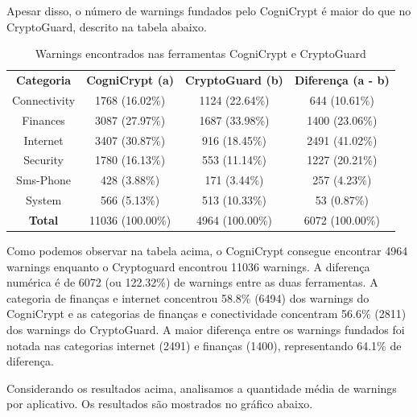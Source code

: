 Apesar disso, o número de warnings fundados pelo CogniCrypt é maior do que no CryptoGuard, descrito na tabela abaixo.

\begin{table}[!htbp]
  \centering
  \begin{tabular}{|c|c|c|c|}
  
\textbf{Categoria}   & \textbf{CogniCrypt (a)}   &  \textbf{CryptoGuard (b)}     &  \textbf{Diferença (a - b)} \\ 
Connectivity           & \num{1768} (\num{16.02}\%)  &  \num{1124} (\num{22.64}\%)  & \num{644} (\num{10.61}\%) \\
Finances                &     \num{3087} (\num{27.97}\%)     &     \num{1687} (\num{33.98}\%)     &     \num{1400} (\num{23.06}\%)\\
Internet                 &     \num{3407} (\num{30.87}\%)     &     \num{916} (\num{18.45}\%)     &     \num{2491} (\num{41.02}\%)\\
Security                 &     \num{1780} (\num{16.13}\%)     &     \num{553} (\num{11.14}\%)     &     \num{1227} (\num{20.21}\%)\\
Sms-Phone            &     \num{428} (\num{3.88}\%)     &     \num{171} (\num{3.44}\%)     &     \num{257} (\num{4.23}\%)\\
System                  &     \num{566} (\num{5.13}\%)     &     \num{513} (\num{10.33}\%)     &     \num{53} (\num{0.87}\%)\\
\textbf{Total}                     &     \num{11036} (\num{100.00}\%)     &     \num{4964} (100.00\%)     &     \num{6072} (\num{100.00}\%)\\
\end{tabular}
    
  \caption{Warnings encontrados nas ferramentas CogniCrypt e CryptoGuard}
\label{AplicativosComWarning}
\end{table}

Como podemos observar na tabela acima, o CogniCrypt consegue encontrar 4964 warnings enquanto o Cryptoguard encontrou 11036 warnings. A diferença numérica é de 6072 (ou 122.32\%) de warnings entre as duas ferramentas. A categoria de finanças e internet concentrou 58.8\% (6494) dos warnings do CogniCrypt e as categorias de finanças e conectividade concentram 56.6\% (2811) dos warnings do CryptoGuard. A maior diferença entre os warnings fundados foi notada nas categorias internet (2491) e finanças (1400), representando 64.1\% de diferença.  \cite{perception_developers}

Considerando os resultados acima, analisamos a quantidade média de warnings por aplicativo. Os resultados são mostrados no gráfico abaixo.

